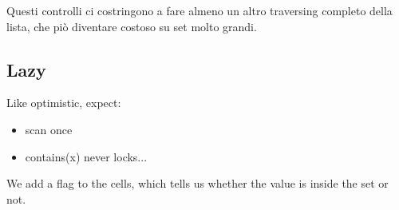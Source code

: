 \documentclass{article}
\begin{document}
Questi controlli ci costringono a fare almeno un altro traversing completo della lista, che piò diventare costoso su set molto grandi.

\subsection{Lazy}
Like optimistic, expect: \begin{itemize}
    \item scan once
    \item contains(x) never locks...
\end{itemize}

We add a flag to the cells, which tells us whether the value is inside the set or not.
\end{document}
